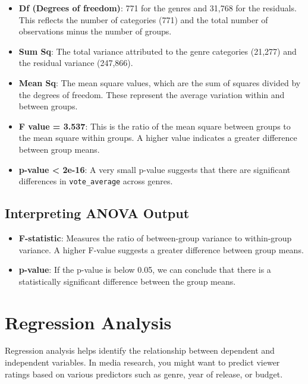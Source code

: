 \documentclass[
]{book}
\providecommand{\tightlist}{%
  \setlength{\itemsep}{0pt}\setlength{\parskip}{0pt}}
\begin{document}
\begin{itemize}
\tightlist
\item
  \textbf{Df (Degrees of freedom)}: 771 for the genres and 31,768 for the residuals. This reflects the number of categories (771) and the total number of observations minus the number of groups.
\item
  \textbf{Sum Sq}: The total variance attributed to the genre categories (21,277) and the residual variance (247,866).
\item
  \textbf{Mean Sq}: The mean square values, which are the sum of squares divided by the degrees of freedom. These represent the average variation within and between groups.
\item
  \textbf{F value = 3.537}: This is the ratio of the mean square between groups to the mean square within groups. A higher value indicates a greater difference between group means.
\item
  \textbf{p-value \textless{} 2e-16}: A very small p-value suggests that there are significant differences in \texttt{vote\_average} across genres.
\end{itemize}

\subsection*{Interpreting ANOVA Output}\label{interpreting-anova-output}

\begin{itemize}
\tightlist
\item
  \textbf{F-statistic}: Measures the ratio of between-group variance to within-group variance. A higher F-value suggests a greater difference between group means.
\item
  \textbf{p-value}: If the p-value is below 0.05, we can conclude that there is a statistically significant difference between the group means.
\end{itemize}

\section{Regression Analysis}\label{regression-analysis}

Regression analysis helps identify the relationship between dependent and independent variables. In media research, you might want to predict viewer ratings based on various predictors such as genre, year of release, or budget.
\end{document}
